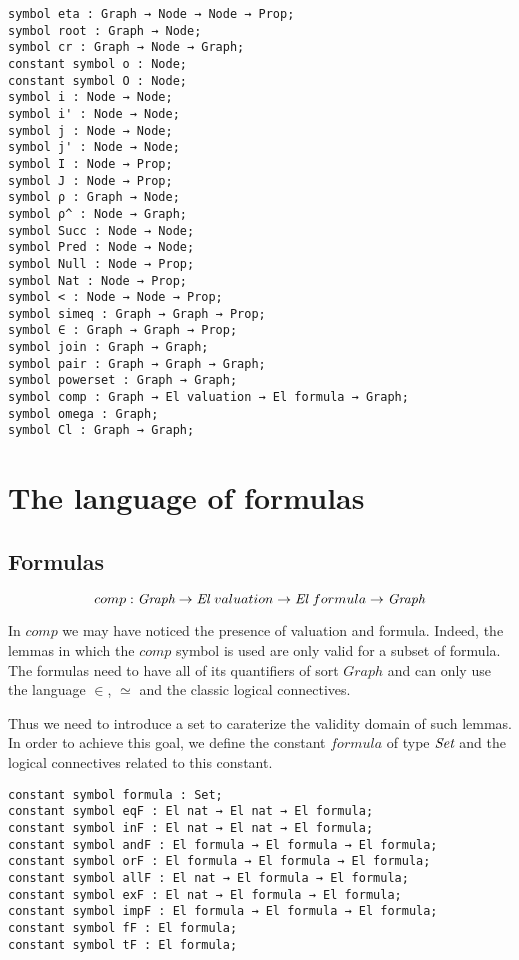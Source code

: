 \documentclass[a4paper]{article}
\begin{document}
\begin{lstlisting}
symbol eta : Graph → Node → Node → Prop;
symbol root : Graph → Node;
symbol cr : Graph → Node → Graph;
constant symbol o : Node;
constant symbol O : Node;
symbol i : Node → Node;
symbol i' : Node → Node;
symbol j : Node → Node;
symbol j' : Node → Node;
symbol I : Node → Prop;
symbol J : Node → Prop;
symbol ρ : Graph → Node;
symbol ρ^ : Node → Graph;
symbol Succ : Node → Node;
symbol Pred : Node → Node;
symbol Null : Node → Prop;
symbol Nat : Node → Prop;
symbol < : Node → Node → Prop;
symbol simeq : Graph → Graph → Prop;
symbol ∈ : Graph → Graph → Prop;
symbol join : Graph → Graph;
symbol pair : Graph → Graph → Graph;
symbol powerset : Graph → Graph;
symbol comp : Graph → El valuation → El formula → Graph;
symbol omega : Graph;
symbol Cl : Graph → Graph;
\end{lstlisting}


\section{The language of formulas}
\subsection{Formulas}

$$comp : {\mbox{\it Graph}} \rightarrow {\mbox{\it El}} \ valuation \rightarrow {\mbox{\it El}} \ formula \rightarrow {\mbox{\it Graph}}$$

In $comp$ we may have noticed the presence of valuation and formula. 
Indeed, the lemmas in which the $comp$ symbol is used are only valid for a subset of formula. The formulas need to have all of its quantifiers of sort $Graph$ and can only use the language $\in$, $\simeq$ and the classic logical connectives.

Thus we need to introduce a set to caraterize the validity domain of such lemmas. In order to achieve this goal, we define the constant $formula$ of type $\mbox{\it Set}$ and the logical connectives related to this constant.

\begin{lstlisting}
constant symbol formula : Set;
constant symbol eqF : El nat → El nat → El formula;
constant symbol inF : El nat → El nat → El formula;
constant symbol andF : El formula → El formula → El formula;
constant symbol orF : El formula → El formula → El formula;
constant symbol allF : El nat → El formula → El formula;
constant symbol exF : El nat → El formula → El formula;
constant symbol impF : El formula → El formula → El formula;
constant symbol fF : El formula;
constant symbol tF : El formula;
\end{lstlisting}
\end{document}

